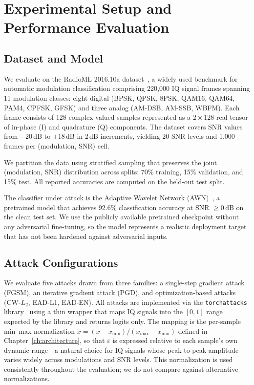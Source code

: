 \chapter{Experimental Setup and Performance Evaluation}
\label{ch:evaluation}

\section{Dataset and Model}

We evaluate on the RadioML 2016.10a dataset~\cite{otoole2016rml}, a widely
used benchmark for automatic modulation classification comprising 220{,}000
IQ signal frames spanning 11 modulation classes: eight digital (BPSK, QPSK,
8PSK, QAM16, QAM64, PAM4, CPFSK, GFSK) and three analog (AM-DSB, AM-SSB,
WBFM). Each frame consists of 128 complex-valued samples represented as a
$2 \times 128$ real tensor of in-phase (I) and quadrature (Q) components.
The dataset covers SNR values from $-20$\,dB to $+18$\,dB in 2\,dB
increments, yielding 20 SNR levels and 1{,}000 frames per (modulation,
SNR) cell.

We partition the data using stratified sampling that preserves the joint
(modulation, SNR) distribution across splits: 70\% training, 15\%
validation, and 15\% test. All reported accuracies are computed on the
held-out test split.

The classifier under attack is the Adaptive Wavelet Network
(AWN)~\cite{li2023awn}, a pretrained model that achieves 92.6\%
classification accuracy at SNR $\geq 0$\,dB on the clean test set. We use
the publicly available pretrained checkpoint without any adversarial
fine-tuning, so the model represents a realistic deployment target that has
not been hardened against adversarial inputs.

\section{Attack Configurations}

We evaluate five attacks drawn from three families: a single-step
gradient attack (FGSM), an iterative gradient attack (PGD), and
optimization-based attacks (CW-$L_2$, EAD-L1, EAD-EN). All attacks are
implemented via the \texttt{torchattacks}
library~\cite{kim2020torchattacks} using a thin wrapper that maps IQ
signals into the $[0, 1]$ range expected by the library and returns
logits only. The mapping is the per-sample min--max normalization
$\tilde{x} = (x - x_{\min})/(x_{\max} - x_{\min})$ defined in
Chapter~\ref{ch:architecture}, so that $\varepsilon$ is expressed
relative to each sample's own dynamic range---a natural choice for IQ
signals whose peak-to-peak amplitude varies widely across modulations
and SNR levels. This normalization is used consistently throughout
the evaluation; we do not compare against alternative
normalizations.

